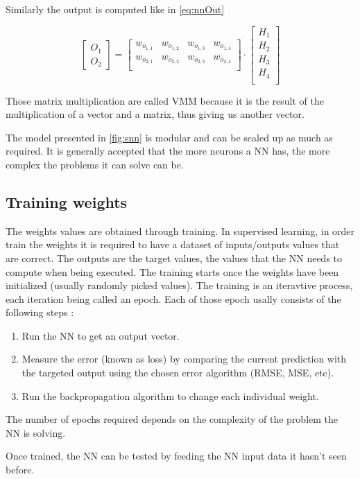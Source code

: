 Similarly the output is computed like in \cref{eq:nnOut}

\begin{equation}\label{eq:nnOut}
  \begin{bmatrix}
    O_1\\ O_2
  \end{bmatrix}
  =
  \begin{bmatrix}
    w_o_{1,1} & w_o_{1,2} & w_o_{1,3} & w_o_{1,4}\\
    w_o_{2,1} & w_o_{2,2} & w_o_{2,3} & w_o_{2,4}\\
  \end{bmatrix}
  \cdot
  \begin{bmatrix}
    H_1\\ H_2\\ H_3\\ H_4\\
  \end{bmatrix}
\end{equation}

Those matrix multiplication are called \ac{VMM} because it is the result of the multiplication of a vector and a matrix, thus giving us another vector.

The model presented in \cref{fig:snn} is modular and can be scaled up as much as required. It is generally accepted that the more neurons a \ac{NN} has, the more complex the problems  it can solve can be.

\subsection{Training weights}

The weights values are obtained through training. In supervised learning, in order train the weights it is required to have a dataset of inputs/outputs values that are correct. The outputs are the target values, the values that the \ac{NN} needs to compute when being executed. The training starts once the weights have been initialized (usually randomly picked values). The training is an iteravtive process, each iteration being called an epoch. Each of those epoch usally consists of the following steps :

\begin{enumerate}
  \item Run the \ac{NN} to get an output vector.\label{step:restart}
  \item Measure the error (known as loss) by comparing the current prediction with the targeted output using the chosen error algorithm (\ac{RMSE}, \ac{MSE}, etc).
  \item Run the backpropagation algorithm to change each individual weight.
\end{enumerate}

The number of epochs required depends on the complexity of the problem the \ac{NN} is solving.

Once trained, the \ac{NN} can be tested by feeding the \ac{NN} input data it hasn't seen before.

